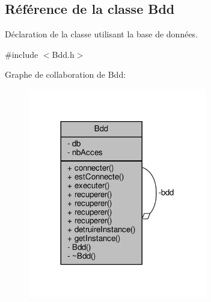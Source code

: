 \hypertarget{class_bdd}{}\subsection{Référence de la classe Bdd}
\label{class_bdd}


Déclaration de la classe utilisant la base de données.  




{\ttfamily \#include $<$Bdd.\+h$>$}



Graphe de collaboration de Bdd\+:
\nopagebreak
\begin{figure}[H]
\begin{center}
\leavevmode
\includegraphics[width=221pt]{class_bdd__coll__graph}
\end{center}
\end{figure}
